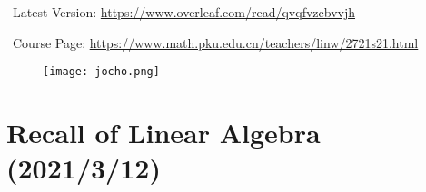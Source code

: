 \documentclass[11pt, a3paper, openany]{article}
\theoremstyle{remark}
\theoremstyle{remark}
\theoremstyle{remark}
\newenvironment{Proof of claim}
  {\begin{proof}[\normalfont \textbf{Proof of claim}]}
  {\end{proof}}
\begin{document}
\Pickup\ Latest Version: \url{https://www.overleaf.com/read/qvqfvzcbvvjh}

\Pickup\ Course Page: \url{https://www.math.pku.edu.cn/teachers/linw/2721s21.html}

\begin{figure}[!b]
	\centering
	\texttt{[image: jocho.png]}
	\vspace{11ex}
\end{figure}

\clearpage
{}
\setcounter{page}{1}

\section{Recall of Linear Algebra \sf\scriptsize (2021/3/12)}
\end{document}
